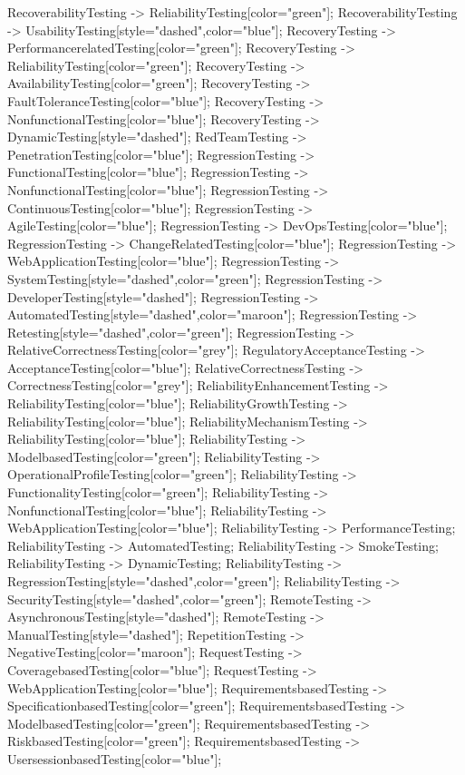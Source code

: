 \documentclass{article}
\begin{document}
{RecoverabilityTesting -> ReliabilityTesting[color="green"];
RecoverabilityTesting -> UsabilityTesting[style="dashed",color="blue"];
RecoveryTesting -> PerformancerelatedTesting[color="green"];
RecoveryTesting -> ReliabilityTesting[color="green"];
RecoveryTesting -> AvailabilityTesting[color="green"];
RecoveryTesting -> FaultToleranceTesting[color="blue"];
RecoveryTesting -> NonfunctionalTesting[color="blue"];
RecoveryTesting -> DynamicTesting[style="dashed"];
RedTeamTesting -> PenetrationTesting[color="blue"];
RegressionTesting -> FunctionalTesting[color="blue"];
RegressionTesting -> NonfunctionalTesting[color="blue"];
RegressionTesting -> ContinuousTesting[color="blue"];
RegressionTesting -> AgileTesting[color="blue"];
RegressionTesting -> DevOpsTesting[color="blue"];
RegressionTesting -> ChangeRelatedTesting[color="blue"];
RegressionTesting -> WebApplicationTesting[color="blue"];
RegressionTesting -> SystemTesting[style="dashed",color="green"];
RegressionTesting -> DeveloperTesting[style="dashed"];
RegressionTesting -> AutomatedTesting[style="dashed",color="maroon"];
RegressionTesting -> Retesting[style="dashed",color="green"];
RegressionTesting -> RelativeCorrectnessTesting[color="grey"];
RegulatoryAcceptanceTesting -> AcceptanceTesting[color="blue"];
RelativeCorrectnessTesting -> CorrectnessTesting[color="grey"];
ReliabilityEnhancementTesting -> ReliabilityTesting[color="blue"];
ReliabilityGrowthTesting -> ReliabilityTesting[color="blue"];
ReliabilityMechanismTesting -> ReliabilityTesting[color="blue"];
ReliabilityTesting -> ModelbasedTesting[color="green"];
ReliabilityTesting -> OperationalProfileTesting[color="green"];
ReliabilityTesting -> FunctionalityTesting[color="green"];
ReliabilityTesting -> NonfunctionalTesting[color="blue"];
ReliabilityTesting -> WebApplicationTesting[color="blue"];
ReliabilityTesting -> PerformanceTesting;
ReliabilityTesting -> AutomatedTesting;
ReliabilityTesting -> SmokeTesting;
ReliabilityTesting -> DynamicTesting;
ReliabilityTesting -> RegressionTesting[style="dashed",color="green"];
ReliabilityTesting -> SecurityTesting[style="dashed",color="green"];
RemoteTesting -> AsynchronousTesting[style="dashed"];
RemoteTesting -> ManualTesting[style="dashed"];
RepetitionTesting -> NegativeTesting[color="maroon"];
RequestTesting -> CoveragebasedTesting[color="blue"];
RequestTesting -> WebApplicationTesting[color="blue"];
RequirementsbasedTesting -> SpecificationbasedTesting[color="green"];
RequirementsbasedTesting -> ModelbasedTesting[color="green"];
RequirementsbasedTesting -> RiskbasedTesting[color="green"];
RequirementsbasedTesting -> UsersessionbasedTesting[color="blue"];
}
\end{document}
